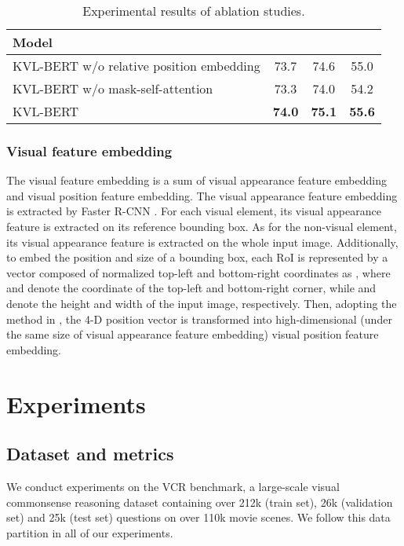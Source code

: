 \documentclass[conference]{IEEEtran}
\begin{document}
\begin{table*}[htp]
\setlength{\abovecaptionskip}{0pt}
\setlength{\belowcaptionskip}{10pt}
\caption{Experimental results of ablation studies.}
\centering
\begin{tabular}{l|ccc}
\hline
Model&  &  &   \\
\hline
KVL-BERT w/o relative position embedding& 73.7 & 74.6& 55.0 \\
KVL-BERT w/o mask-self-attention& 73.3& 74.0 & 54.2 \\
KVL-BERT & \textbf{74.0}& \textbf{75.1}& \textbf{55.6} \\




\hline
\end{tabular}
\label{tab_ablation}
\end{table*}







\subsubsection{Visual feature embedding}
The visual feature embedding is a sum of visual appearance feature embedding and visual position feature embedding. The visual appearance feature embedding is extracted by Faster R-CNN \cite{b39}. For each visual element, its visual appearance feature is extracted on its reference bounding box. As for the non-visual element, its visual appearance feature is extracted on the whole input image. Additionally, to embed the position and size of a bounding box, each RoI is represented by a vector composed of normalized top-left and bottom-right coordinates  as , where  and  denote the coordinate of the top-left and bottom-right corner, while  and  denote the height and width of the input image, respectively. Then, adopting  the method in \cite{b40}, the 4-D position vector is transformed into high-dimensional (under the same size of visual appearance feature embedding) visual position feature embedding. 








\section{Experiments}


\subsection{Dataset and metrics}
We conduct experiments on the VCR \cite{b10} benchmark, a large-scale visual commonsense reasoning dataset containing over 212k (train set), 26k (validation set) and 25k (test set) questions on over 110k movie scenes. We follow this data partition in all of our experiments. 
\end{document}
